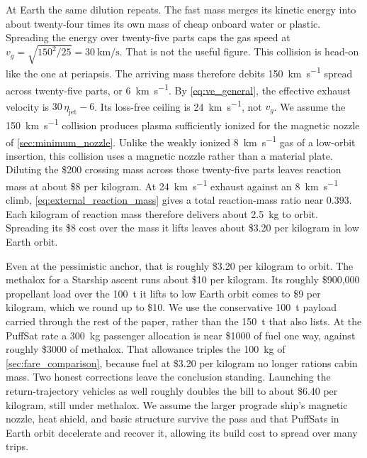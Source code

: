 \documentclass{article}
\begin{document}
At Earth the same dilution repeats. The fast mass merges its kinetic energy into about twenty-four times its own mass of cheap onboard water or plastic. Spreading the energy over twenty-five parts caps the gas speed at $v_g = \sqrt{150^2/25} = \SI{30}{\kilo\meter\per\second}$. That is not the useful figure. This collision is head-on like the one at periapsis. The arriving mass therefore debits \SI{150}{\kilo\meter\per\second} spread across twenty-five parts, or \SI{6}{\kilo\meter\per\second}. By \autoref{eq:ve_general}, the effective exhaust velocity is $30\,\eta_{\mathrm{jet}} - 6$. Its loss-free ceiling is \SI{24}{\kilo\meter\per\second}, not $v_g$. We assume the \SI{150}{\kilo\meter\per\second} collision produces plasma sufficiently ionized for the magnetic nozzle of \autoref{sec:minimum_nozzle}. Unlike the weakly ionized \SI{8}{\kilo\meter\per\second} gas of a low-orbit insertion, this collision uses a magnetic nozzle rather than a material plate. Diluting the \$200 crossing mass across those twenty-five parts leaves reaction mass at about \$8 per kilogram. At \SI{24}{\kilo\meter\per\second} exhaust against an \SI{8}{\kilo\meter\per\second} climb, \autoref{eq:external_reaction_mass} gives a total reaction-mass ratio near $0.393$. Each kilogram of reaction mass therefore delivers about \SI{2.5}{\kilo\gram} to orbit. Spreading its \$8 cost over the mass it lifts leaves about \$3.20 per kilogram in low Earth orbit.

Even at the pessimistic anchor, that is roughly \$3.20 per kilogram to orbit. The methalox for a Starship ascent runs about \$10 per kilogram. Its roughly \$900{,}000 propellant load \cite{spacex_starship_cost} over the \SI{100}{\tonne} it lifts to low Earth orbit \cite{gunter_starship} comes to \$9 per kilogram, which we round up to \$10. We use the conservative \SI{100}{\tonne} payload carried through the rest of the paper, rather than the \SI{150}{\tonne} that \cite{gunter_starship} also lists. At the PuffSat rate a \SI{300}{\kilo\gram} passenger allocation is near \$1000 of fuel one way, against roughly \$3000 of methalox. That allowance triples the \SI{100}{\kilo\gram} of \autoref{sec:fare_comparison}, because fuel at \$3.20 per kilogram no longer rations cabin mass. Two honest corrections leave the conclusion standing. Launching the return-trajectory vehicles as well roughly doubles the bill to about \$6.40 per kilogram, still under methalox. We assume the larger prograde ship's magnetic nozzle, heat shield, and basic structure survive the pass and that PuffSats in Earth orbit decelerate and recover it, allowing its build cost to spread over many trips.
\end{document}
